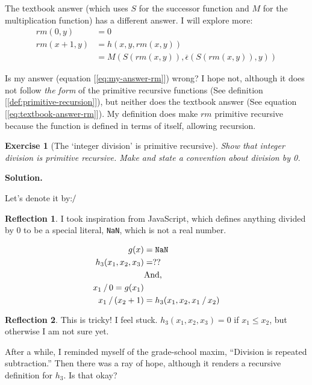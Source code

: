 \documentclass[11pt]{book}
\theoremstyle{definition}
\theoremstyle{plain}
\newtheorem{exercise}{Exercise}[chapter]
\theoremstyle{problemstyle}
\theoremstyle{remark}
\theoremstyle{definition}
\newtheorem{reflection}{Reflection}
\begin{document}
The textbook answer (which uses $S$ for the successor function and $M$ for the multiplication function) has a different answer. I will explore more:
            \begin{equation}
                \label{eq:textbook-answer-rm}
                \begin{aligned}
                    rm(0,y)&=0\\
                    rm(x+1,y)&=h(x,y,rm(x,y))\\
                             &=M(S(rm(x,y)),\overline\epsilon(S(rm(x,y)),y))
                \end{aligned}
            \end{equation}

Is my answer (equation [\ref{eq:my-answer-rm}]) wrong? I hope not, although it does not follow \emph{the form} of the primitive recursive functions (See definition [\ref{def:primitive-recursion}]), but neither does the textbook answer (See equation [\ref{eq:textbook-answer-rm}]). My definition does make $rm$ primitive recursive because the function is defined in terms of itself, allowing recursion.

\begin{exercise}[The `integer division' is primitive recursive]
Show that integer division is primitive recursive. Make and state a convention about division by 0.
\end{exercise}
\textbf{Solution.}

Let's denote it by:$\sfrac{}{}$

\begin{reflection}
    I took inspiration from JavaScript, which defines anything divided by 0 to be a special literal, \texttt{NaN}, which is not a real number.
\end{reflection}
            \begin{equation}
                \label{eq:integer-division}
                \begin{aligned}
                    g(x)&=\texttt{NaN}\\
                    h_3(x_1,x_2,x_3)&=??\\
                    &\text{And,}\\
                    x_1\;\sfrac{}{}\;0=g(x_1)\\
                    x_1\;\sfrac{}{}\;(x_2+1)&=h_3(x_1,x_2,x_1\;\sfrac{}{}\;x_2)
                \end{aligned}
            \end{equation}
\begin{reflection}
    This is tricky! I feel stuck. $h_3(x_1,x_2,x_3)=0$ if $x_1\leq x_2$, but otherwise I am not sure yet.

    After a while, I reminded myself of the grade-school maxim, ``Division is repeated subtraction.'' Then there was a ray of hope, although it renders a recursive definition for $h_3$. Is that okay?
\end{reflection}
\end{document}
